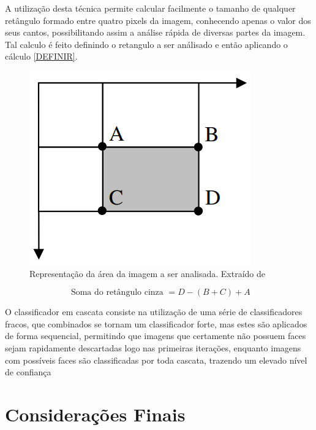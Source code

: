 A utilização desta técnica permite calcular facilmente o tamanho de qualquer retângulo formado entre quatro pixels da imagem, conhecendo apenas o valor dos seus cantos, possibilitando assim a análise rápida de diversas partes da imagem. Tal calculo é feito definindo o retangulo a ser análisado e então aplicando o cálculo \ref{DEFINIR}.

\begin{figure}[htpb]
    \centering
    \includegraphics[scale=.3]{figs/imagem-integral-calculo.png}
    \caption{Representação da área da imagem a ser analisada. Extraído de }
    \label{fig:img-integral}
 \end{figure}

 \begin{equation}\label{eq:img-integral}
    \text{ Soma do retângulo cinza } = D - (B + C) + A
\end{equation}


O classificador em cascata consiste na utilização de uma série de classificadores fracos, que combinados se tornam um classificador forte, mas estes são aplicados de forma sequencial, permitindo que imagens que certamente não possuem faces sejam rapidamente descartadas logo nas primeiras iterações, enquanto imagens com possíveis faces são classificadas por toda cascata, trazendo um elevado nível de confiança

\section{Considerações Finais}

\lipsum[23]
